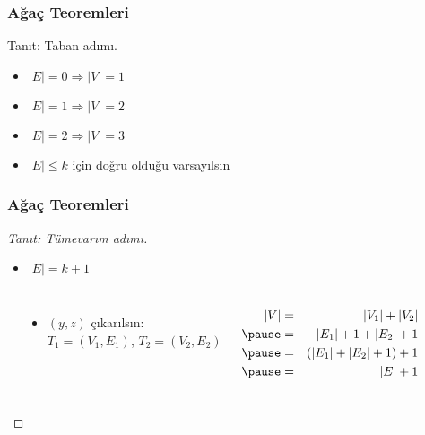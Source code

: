 \documentclass[dvipsnames]{beamer}
\theoremstyle{definition}
\theoremstyle{example}
\theoremstyle{plain}
\begin{document}
\begin{frame}
  \frametitle{Ağaç Teoremleri}

  \begin{block}{Tanıt: Taban adımı.}
    \begin{itemize}
      \item $|E|=0 \Rightarrow |V|=1$
      \item $|E|=1 \Rightarrow |V|=2$
      \item $|E|=2 \Rightarrow |V|=3$

      \pause
      \medskip
      \item $|E| \leq k$ için doğru olduğu varsayılsın
    \end{itemize}
  \end{block}
\end{frame}

\begin{frame}
  \frametitle{Ağaç Teoremleri}

  \begin{proof}[Tanıt: Tümevarım adımı]
    \begin{itemize}
      \item $|E|=k+1$
    \end{itemize}

    \begin{columns}[t]
      \begin{center}
      \end{center}

      \pause
      \begin{itemize}
        \item $(y,z)$ çıkarılsın:\\
          $T_1=(V_1,E_1)$, $T_2=(V_2,E_2)$
      \end{itemize}
      \pause
      \begin{eqnarray*}
        |V| & = & |V_1|+|V_2|\\\pause
            & = & |E_1|+1+|E_2|+1\\\pause
            & = & (|E_1|+|E_2|+1)+1\\\pause
            & = & |E|+1
      \end{eqnarray*}
    \end{columns}
  \end{proof}
\end{frame}
\end{document}
